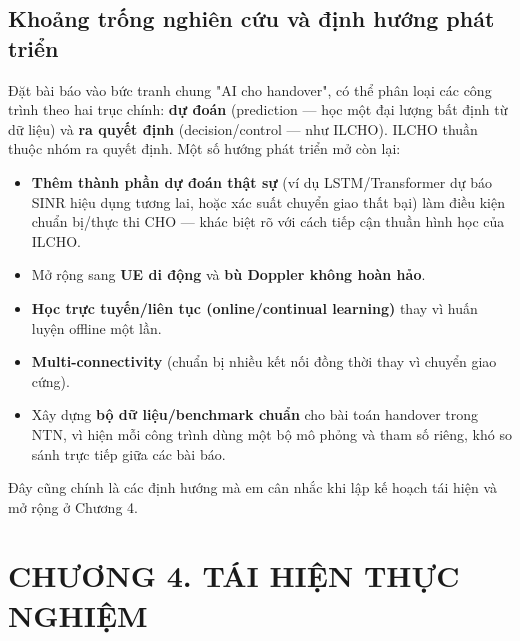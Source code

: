 \documentclass{article} %
\begin{document}
\subsection{Khoảng trống nghiên cứu và định hướng phát triển}
Đặt bài báo vào bức tranh chung "AI cho handover", có thể phân loại các công trình theo hai trục chính: \textbf{dự đoán} (prediction — học một đại lượng bất định từ dữ liệu) và \textbf{ra quyết định} (decision/control — như ILCHO). ILCHO thuần thuộc nhóm ra quyết định. Một số hướng phát triển mở còn lại:
\begin{itemize}
    \item \textbf{Thêm thành phần dự đoán thật sự} (ví dụ LSTM/Transformer dự báo SINR hiệu dụng tương lai, hoặc xác suất chuyển giao thất bại) làm điều kiện chuẩn bị/thực thi CHO — khác biệt rõ với cách tiếp cận thuần hình học của ILCHO.
    \item Mở rộng sang \textbf{UE di động} và \textbf{bù Doppler không hoàn hảo}.
    \item \textbf{Học trực tuyến/liên tục (online/continual learning)} thay vì huấn luyện offline một lần.
    \item \textbf{Multi-connectivity} (chuẩn bị nhiều kết nối đồng thời thay vì chuyển giao cứng).
    \item Xây dựng \textbf{bộ dữ liệu/benchmark chuẩn} cho bài toán handover trong NTN, vì hiện mỗi công trình dùng một bộ mô phỏng và tham số riêng, khó so sánh trực tiếp giữa các bài báo.
\end{itemize}
Đây cũng chính là các định hướng mà em cân nhắc khi lập kế hoạch tái hiện và mở rộng ở Chương 4.

\newpage
\section*{CHƯƠNG 4. TÁI HIỆN THỰC NGHIỆM}
\setcounter{section}{4}
\setcounter{subsection}{0}
\setcounter{figure}{0}
\setcounter{table}{0}
\end{document}
